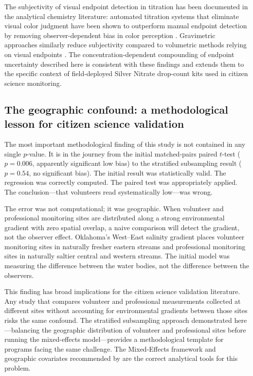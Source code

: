 \documentclass[lineno]{wlpeerj}
\begin{document}
The subjectivity of visual endpoint detection in titration has been documented in the analytical chemistry literature: automated titration systems that eliminate visual color judgment have been shown to outperform manual endpoint detection by removing observer-dependent bias in color perception \citep{Boppana2023}. Gravimetric approaches similarly reduce subjectivity compared to volumetric methods relying on visual endpoints \citep{Kejla2022}. The concentration-dependent compounding of endpoint uncertainty described here is consistent with these findings and extends them to the specific context of field-deployed Silver Nitrate drop-count kits used in citizen science monitoring.

\subsection{The geographic confound: a methodological lesson for citizen science validation}

The most important methodological finding of this study is not contained in any single $p$-value. It is in the journey from the initial matched-pairs paired $t$-test ($p = 0.006$, apparently significant low bias) to the stratified subsampling result ($p = 0.54$, no significant bias). The initial result was statistically valid. The regression was correctly computed. The paired test was appropriately applied. The conclusion---that volunteers read systematically low---was wrong.

The error was not computational; it was geographic. When volunteer and professional monitoring sites are distributed along a strong environmental gradient with zero spatial overlap, a naive comparison will detect the gradient, not the observer effect. Oklahoma's West--East salinity gradient \citep{Dyer2025} places volunteer monitoring sites in naturally fresher eastern streams and professional monitoring sites in naturally saltier central and western streams. The initial model was measuring the difference between the water bodies, not the difference between the observers.

This finding has broad implications for the citizen science validation literature. Any study that compares volunteer and professional measurements collected at different sites without accounting for environmental gradients between those sites risks the same confound. The stratified subsampling approach demonstrated here---balancing the geographic distribution of volunteer and professional sites before running the mixed-effects model---provides a methodological template for programs facing the same challenge. The Mixed-Effects framework and geographic covariates recommended by \citet{Dyer2025} are the correct analytical tools for this problem.
\end{document}
